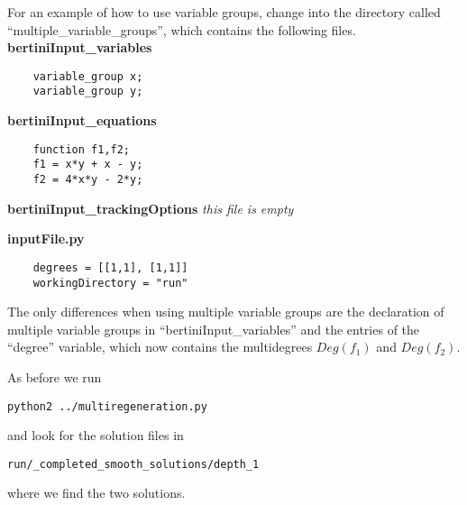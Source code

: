 \documentclass[12pt]{article}
\theoremstyle{definition}
\begin{document}
For an example of how to use variable groups, change into the directory 
called ``multiple\_variable\_groups'', which contains the following 
files.\\

\noindent \textbf{bertiniInput\_variables}
\begin{leftbar}
\vspace{-10pt} 
\begin{verbatim}
    variable_group x; 
    variable_group y; 
\end{verbatim}\vspace{-10pt} 
\end{leftbar}

\noindent \textbf{bertiniInput\_equations}
\begin{leftbar}
\vspace{-10pt} 
\begin{verbatim}
    function f1,f2;
    f1 = x*y + x - y;
    f2 = 4*x*y - 2*y;
\end{verbatim}\vspace{-10pt} 
\end{leftbar}

\noindent \textbf{bertiniInput\_trackingOptions}
\emph{this file is empty}

\noindent \textbf{inputFile.py}
\begin{leftbar}
\vspace{-10pt} 
\begin{verbatim}
    degrees = [[1,1], [1,1]]
    workingDirectory = "run"
\end{verbatim}\vspace{-10pt} 
\end{leftbar}

The only differences when using multiple variable groups are the 
declaration of multiple variable groups in ``bertiniInput\_variables'' 
and the entries of the ``degree'' variable, which now contains the 
multidegrees $Deg(f_1)$ and $Deg(f_2)$.

\noindent As before we run
\begin{leftbar}
\vspace{-10pt} 
\begin{verbatim}
python2 ../multiregeneration.py
\end{verbatim}\vspace{-10pt} 
\end{leftbar}
\noindent and look for the solution files in 
\begin{leftbar}
\vspace{-10pt} 
\begin{verbatim}
run/_completed_smooth_solutions/depth_1
\end{verbatim}\vspace{-10pt} 
\end{leftbar}
\noindent where we find the two solutions.
\end{document}
